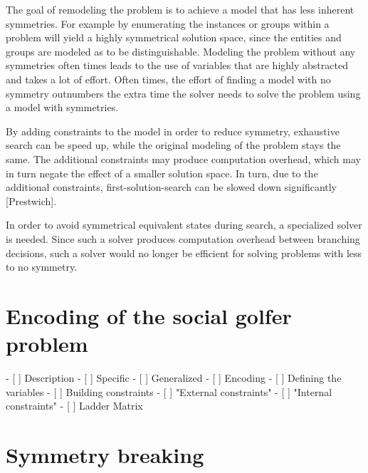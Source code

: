 \documentclass[a4paper]{scrartcl}
\begin{document}
The goal of remodeling the problem is to achieve a model that has less inherent symmetries. For example by enumerating the instances or groups within a problem will yield a highly symmetrical solution space, since the entities and groups are modeled as to be distinguishable. Modeling the problem without any symmetries often times leads to the use of variables that are highly abstracted and takes a lot of effort. Often times, the effort of finding a model with no symmetry outnumbers the extra time the solver needs to solve the problem using a model with symmetries.

By adding constraints to the model in order to reduce symmetry, exhaustive search can be speed up, while the original modeling of the problem stays the same. The additional constraints may produce computation overhead, which may in turn negate the effect of a smaller solution space. In turn, due to the additional constraints, first-solution-search can be slowed down significantly [Prestwich].

In order to avoid symmetrical equivalent states during search, a specialized solver is needed. Since such a solver produces computation overhead between branching decisions, such a solver would no longer be efficient for solving problems with less to no symmetry.






\section{Encoding of the social golfer problem}

- [ ] Description
    - [ ] Specific
    - [ ] Generalized
- [ ] Encoding
    - [ ] Defining the variables
    - [ ] Building constraints
        - [ ] "External constraints"
        - [ ] "Internal constraints"
            - [ ] Ladder Matrix

\section{Symmetry breaking}
\end{document}
